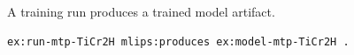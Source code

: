 A training run produces a trained model artifact.
\begin{lstlisting}[language=turtle]
ex:run-mtp-TiCr2H mlips:produces ex:model-mtp-TiCr2H .
\end{lstlisting}
